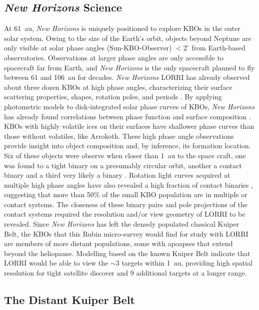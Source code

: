 \documentclass[modern,linenumbers,trackchanges,preprint]{aastex631}
\begin{document}
\subsection{{\it New Horizons} Science}
At 61~au, {\it New Horizons} is uniquely positioned to explore KBOs in the outer solar system.
Owing to the size of the Earth's orbit, objects beyond Neptune are only visible at solar phase angles (Sun-KBO-Observer) $<2^\circ$ from Earth-based observatories.
Observations at larger phase angles are only accessible to spacecraft far from Earth, and {\it New Horizons} is the only spacecraft planned to fly between 61 and 106~au for decades.
{\it New Horizons} LORRI has already observed about three dozen KBOs at high phase angles, characterizing their surface scattering properties, shapes, rotation poles, and periods \citep{Porter2016, Verbiscer2019, Verbiscer2022}.
By applying photometric models to disk-integrated solar phase curves of KBOs, {\it New Horizons} has already found correlations between phase function and surface composition \citep{Verbiscer2022}. 
KBOs with highly volatile ices on their surfaces have shallower phase curves than those without volatiles, like Arrokoth. 
These high phase angle observations provide insight into object composition and, by inference, its formation location.
Six of these objects were observe when closer than 1~au to the space craft, one was found to a tight binary on a presumably circular orbit, another a contact binary and a third very likely a binary \citep{2022PSJ.....3...46W}.
Rotation light curves acquired at multiple high phase angles have also revealed a high fraction of contact binaries \citep{Porter2024}, suggesting that more than 50\% of the small KBO population are in multiple or contact systems. The closeness of these binary pairs and pole projections of the contact systems required the resolution and/or view geometry of LORRI to be revealed.
Since {\it New Horizons} has left the densely populated classical Kuiper Belt, the KBOs that this Rubin micro-survey would find for study with LORRI are members of more distant populations, some with apoapses that extend beyond the heliopause.
Modelling based on the known Kuiper Belt indicate that LORRI would be able to view the $\sim$3 targets within 1~au, providing high spatial resolution for tight satellite discover and 9 additional targets at a longer range. 

\subsection{The Distant Kuiper Belt}
\end{document}
